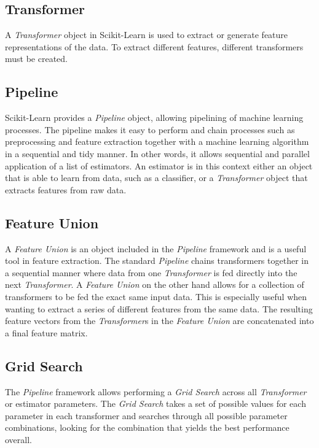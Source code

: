 \subsection*{Transformer}
A \textit{Transformer} object in Scikit-Learn is used to extract or generate feature representations of the data. To extract different features, different transformers must be created.

\subsection*{Pipeline}
Scikit-Learn provides a \textit{Pipeline} object, allowing pipelining of machine learning processes. The pipeline makes it easy to perform and chain processes such as preprocessing and feature extraction together with a machine learning algorithm in a sequential and tidy manner. In other words, it allows sequential and parallel application of a list of estimators. An estimator is in this context either an object that is able to learn from data, such as a classifier, or a \textit{Transformer} object that extracts features from raw data.

\subsection*{Feature Union}
A \textit{Feature Union} is an object included in the \textit{Pipeline} framework and is a useful tool in feature extraction. The standard \textit{Pipeline} chains transformers together in a sequential manner where data from one \textit{Transformer} is fed directly into the next \textit{Transformer}. A \textit{Feature Union} on the other hand allows for a collection of transformers to be fed the exact same input data. This is especially useful when wanting to extract a series of different features from the same data. The resulting feature vectors from the \textit{Transformer}s in the \textit{Feature Union} are concatenated into a final feature matrix. 

\subsection*{Grid Search}
The \textit{Pipeline} framework allows performing a \textit{Grid Search} across all \textit{Transformer} or estimator parameters. The \textit{Grid Search} takes a set of possible values for each parameter in each transformer and searches through all possible parameter combinations, looking for the combination that yields the best performance overall.

